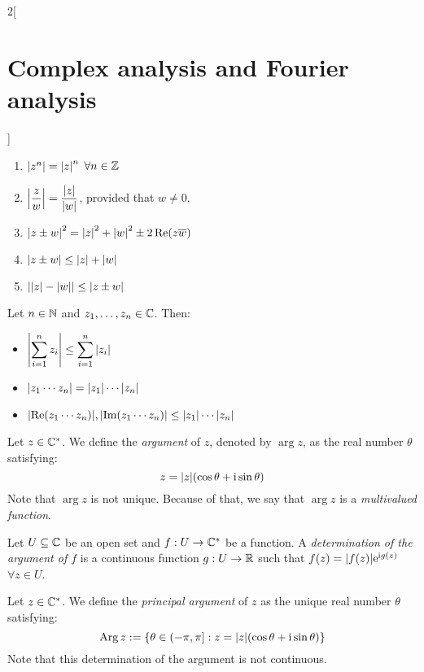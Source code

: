 \documentclass[../../../main.tex]{subfiles}
\begin{document}
\begin{multicols}{2}[\section{Complex analysis and Fourier analysis}]
\begin{proposition}
\begin{enumerate}
      \item $\abs{z^n}={\abs{z}}^n$ $\forall n\in\mathbb{Z}$
      \item $\displaystyle\abs{\frac{z}{w}}=\frac{\abs{z}}{\abs{w}}$, provided that $w\ne 0$.
      \item ${\abs{z\pm w}}^2={\abs{z}}^2+{\abs{w}}^2\pm 2\Re(z\overline{w})$
      \item $\abs{z\pm w}\leq \abs{z}+ \abs{w}$
      \item $\abs{\abs{z}-\abs{w}}\leq \abs{z\pm w}$
    \end{enumerate}
  \end{proposition}
  \begin{corollary}
    Let $n\in\mathbb{N}$ and $z_1, \ldots, z_n \in \mathbb{C}$. Then:
    \begin{itemize}
      \item $\displaystyle \abs{\sum_{i=1}^n{z_i}} \leq \sum_{i=1}^n{\abs{z_i}}$
      \item $\displaystyle \abs{z_1 \cdots z_n} = \abs{z_1} \cdots \abs{z_n}$
      \item $\displaystyle \abs{\Re(z_1 \cdots z_n)},\abs{\Im(z_1 \cdots z_n)} \leq \abs{z_1} \cdots \abs{z_n}$
    \end{itemize}
  \end{corollary}
  \begin{definition}
    Let $z \in \mathbb{C}^*$. We define the \textit{argument} of $z$, denoted by $\arg{z}$, as the real number $\theta$ satisfying: $$z = \abs{z}(\cos{\theta} + \mathrm{i}\sin{\theta})$$ Note that $\arg{z}$ is not unique. Because of that, we say that $\arg z$ is a \emph{multivalued function}.
  \end{definition}
  \begin{definition}
    Let $U\subseteq\mathbb{C}$ be an open set and $f: U\rightarrow\mathbb{C}^*$ be a function. A \emph{determination of the argument of $f$} is a continuous function $g:U\rightarrow \mathbb{R}$ such that $f(z)=\abs{f(z)}\mathrm{e}^{\mathrm{i} g(z)}$ $\forall z\in U$.
  \end{definition}
  \begin{definition}
    Let $z \in \mathbb{C}^*$. We define the \textit{principal argument} of $z$ as the unique real number $\theta$ satisfying:
    $$\operatorname{Arg} z := \{\theta \in (-\pi, \pi]:z = \abs{z}(\cos{\theta} + \mathrm{i}\sin{\theta})\}$$
    Note that this determination of the argument is not continuous.

\end{definition}
\end{multicols}
\end{document}
